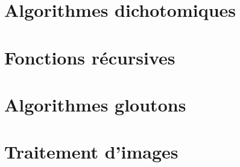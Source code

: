 \section*{Algorithmes dichotomiques}
\renewcommand{\repExo}{../../Informatique/S1_Themes/04_AlgorithmesDichotomiques}

\renewcommand{\td}{01_RechercheDichotomique}
\graphicspath{{\repStyle/png/}{\repExo/\td/images/}}


\renewcommand{\td}{02_ExponentiationRapide}
\graphicspath{{\repStyle/png/}{\repExo/\td/images/}}


\section*{Fonctions récursives}
\renewcommand{\repExo}{../../Informatique/S1_Themes/05_FonctionsRecursives}

\renewcommand{\td}{01_AlgorithmesDichotomiques}
\graphicspath{{\repStyle/png/}{\repExo/\td/images/}}


\renewcommand{\td}{02_FiguresAlphaNumeriques}
\graphicspath{{\repStyle/png/}{\repExo/\td/images/}}


\renewcommand{\td}{03_Fractales}
\graphicspath{{\repStyle/png/}{\repExo/\td/images/}}


\renewcommand{\td}{04_EnumerationListes}
\graphicspath{{\repStyle/png/}{\repExo/\td/images/}}


\section*{Algorithmes gloutons}
\renewcommand{\repExo}{../../Informatique/S1_Themes/06_Gloutons}

\renewcommand{\td}{01_RenduMonnaie}
\graphicspath{{\repStyle/png/}{\repExo/\td/images/}}


\renewcommand{\td}{02_AllocationSalles}
\graphicspath{{\repStyle/png/}{\repExo/\td/images/}}



\renewcommand{\td}{03_SelectionActivites}
\graphicspath{{\repStyle/png/}{\repExo/\td/images/}}



\section*{Traitement d'images}
\renewcommand{\repExo}{../../Informatique/S1_Themes/07_Images}

